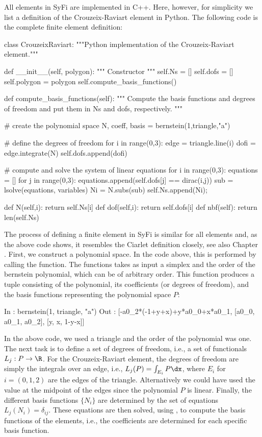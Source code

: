 All elements in SyFi are implemented in C++. Here, however, for simplicity we list a definition 
of the Crouzeix-Raviart element in Python.  The following code is the complete
finite element definition: 
\begin{python}
class CrouzeixRaviart: 
  """Python implementation of the Crouzeix-Raviart element.""" 

  def __init__(self, polygon):  
    """ Constructor """
    self.Ns = []
    self.dofs = []
    self.polygon = polygon 
    self.compute_basis_functions()

  def compute_basis_functions(self): 
    """ Compute the basis functions and degrees of freedom  
    and put them in Ns and dofs, respectively.  """

    # create the polynomial space
    N, coeff, basis = bernstein(1,triangle,"a")

    # define the degrees of freedom 
    for i in range(0,3): 
      edge = triangle.line(i)
      dofi = edge.integrate(N) 
      self.dofs.append(dofi)

    # compute and solve the system of linear equations
    for i in range(0,3): 
      equations = []
      for j in range(0,3): 
        equations.append(self.dofs[j] == dirac(i,j))
      sub = lsolve(equations, variables) 
      Ni = N.subs(sub) 
      self.Ns.append(Ni); 

  def N(self,i): return self.Ns[i]
  def dof(self,i): return self.dofs[i]
  def nbf(self): return len(self.Ns)
\end{python}
The process of defining a finite element in SyFi is similar for all elements and,
as the above code shows,  it resembles the Ciarlet definition closely, see also Chapter \cite{kirby-1}. 
First, we construct a polynomial space. In the code above, this is performed by calling the 
function. The  functions takes as input a simplex and the order of the bernstein polynomial, 
which can be of arbitrary order. This function produces a tuple consisting of 
the polynomial, its coefficients (or degrees of freedom), and the basis functions
representing the polynomial space $P$: 
\begin{python}
In  : bernstein(1, triangle, "a")
Out : [-a0_2*(-1+y+x)+y*a0_0+x*a0_1, [a0_0, a0_1, a0_2], [y, x, 1-y-x]]
\end{python}
In the above code, we used a triangle and the order of the polynomial was one. The next task is to 
define a set of degrees of freedom, i.e., a set of functionals $L_j : P \rightarrow \R$. 
For the Crouzeix-Raviart element, the degrees of freedom are simply the integrals 
over an edge, i.e., $L_j(P) = \int_{E_i} P \dx$, where $E_i$ for $i=(0,1,2)$ are the edges of 
the triangle. Alternatively we could have used
the value at the midpoint of the edges since the polynomial $P$ is linear. 
Finally, the different basis functions $\{N_i\}$ are determined by the  
set of equations $L_j(N_i) = \delta_{ij}$. 
These equations are then solved, using , to compute the basis functions of the elements, i.e., the
coefficients \emp{[a0\_0, a0\_1, a0\_2]}  are determined for each specific basis function.

